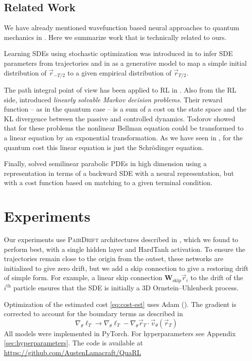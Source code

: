 \documentclass[12pt]{msml2020} %
\newcommand*{\br}{\vec{r}}
\begin{document}
\subsection{Related Work}

We have already mentioned wavefunction based neural approaches to quantum mechanics in . Here we summarize work that is technically related to ours.

Learning SDEs using stochastic optimization was introduced in \cite{Ryder:2018aa} to infer SDE parameters from trajectories and in \cite{Tzen:2019aa} as a generative model to map a simple initial distribution of $\vec{r}_{-T/2}$ to a given empirical distribution of $\vec{r}_{T/2}$.

The path integral point of view has been applied to RL in \cite{Kappen:2007aa,Theodorou:2010aa}. Also from the RL side, \cite{Todorov:2007aa} introduced \emph{linearly solvable Markov decision problems}. Their reward function -- as in the quantum case -- is a sum of a cost on the state space and the KL divergence between the passive and controlled dynamics. Todorov showed that for these problems the nonlinear Bellman equation could be transformed to a linear equation by an exponential transformation. As we have seen in , for the quantum cost this linear equation is just the Schr\"odinger equation. 

Finally, \cite{Han:2018aa} solved semilinear parabolic PDEs in high dimension using a representation in terms of a backward SDE with a neural representation, but with a cost function based on matching to a given terminal condition.

\section{Experiments} \label{sec:exp}

Our experiments use \textsc{PairDrift} architectures described in , which we found to perform best, with a single hidden layer and HardTanh activation. To ensure the trajectories remain close to the origin from the outset, these networks are initialized to give zero drift, but we add a skip connection to give a restoring drift of simple form. For example, a linear skip connection $\mathbf{W}_\text{skip}\br_i$ to the drift of the $i^\text{th}$ particle ensures that the SDE is initially a 3D Ornstein--Uhlenbeck process.

Optimization of the estimated cost \eqref{eq:cost-est} uses Adam (\cite{Kingma:2015ab}). The gradient is corrected to account for the boundary terms as described in 
%
\begin{equation}
    \nabla_\theta \ell_T \to \nabla_\theta \ell_T-\nabla_\theta \vec{r}_T \cdot \vec{v}_\theta(\vec{r}_T)
\end{equation}
%
All models were implemented in PyTorch. For hyperparameters see Appendix \ref{sec:hyperparameters}. The code is available at \url{https://github.com/AustenLamacraft/QuaRL}
\end{document}
